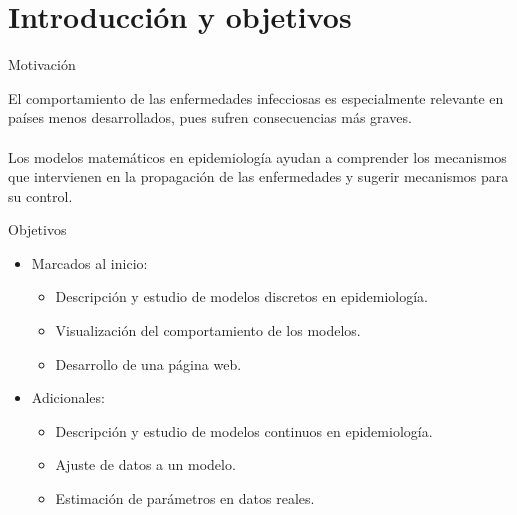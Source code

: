 \section{Introducción y objetivos}


\begin{frame}[c]{Motivación}

    El comportamiento de las enfermedades infecciosas es especialmente relevante en países menos desarrollados, pues sufren consecuencias más graves.
    \\~\\
    Los modelos matemáticos en epidemiología ayudan a comprender los mecanismos que intervienen en la propagación de las enfermedades y sugerir mecanismos para su control.

\end{frame}


\begin{frame}{Objetivos}

    \begin{itemize}
        \item Marcados al inicio:

        \pause
        \begin{itemize}
            \item Descripción y estudio de modelos discretos en epidemiología.
            \pause
            \item Visualización del comportamiento de los modelos.
            \pause
            \item Desarrollo de una página web.
        \end{itemize}
        
        \pause
        \item Adicionales:

        \pause
        \begin{itemize}
            \item Descripción y estudio de modelos continuos en epidemiología.
            \pause
            \item Ajuste de datos a un modelo.
            \pause
            \item Estimación de parámetros en datos reales.
        \end{itemize}
    \end{itemize}

\end{frame}




